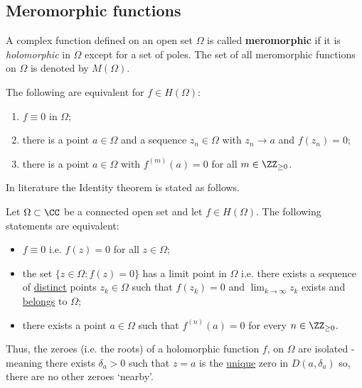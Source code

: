 \documentclass[12pt, a4paper]{article}
\begin{document}
\subsection{Meromorphic functions}

\begin{definition}
    A complex function defined on an open set \(\Omega\) is called \textbf{meromorphic} if it is \textit{holomorphic} in \(\Omega\) except for a set of poles. The set of all meromorphic functions on \(\Omega\) is denoted by \(M(\Omega)\).
\end{definition}

\begin{mdprop}
    The following are equivalent for \(f \in H(\Omega)\):
    \begin{enumerate}
        \item \(f \equiv 0\) in \(\Omega\);
        \item there is a point \(a \in \Omega\) and a sequence \(z_n \in \Omega\) with \(z_n\to a\) and \(f(z_n)=0\);
        \item there is a point \(a \in \Omega\) with \(f^{(m)}(a) =0\) for all \(m \in \ZZ_{\geq 0}\).
    \end{enumerate}
\end{mdprop}

\begin{mdremark}
    In literature the Identity theorem is stated as follows.
    \begin{theorem}
        Let \(\Omega \subset \CC\) be a connected open set and let \(f \in H(\Omega)\). The following statements are equivalent:
        \begin{itemize}
            \item \(f \equiv 0\) i.e. \(f(z)=0\) for all \(z \in \Omega\);
            \item the set \(\{z \in \Omega : f(z)=0\}\) has a limit point in \(\Omega\) i.e. there exists a sequence of \underline{distinct} points \(z_k \in \Omega\) such that \(f(z_k)=0\) and \(\lim_{k \to \infty} z_k\) exists and \underline{belongs} to \(\Omega\);
            \item there exists a point \(a \in \Omega\) such that \(f^{(n)}(a)=0\) for every \(n \in \ZZ_{\geq 0}\).
        \end{itemize}
    \end{theorem}
\end{mdremark}

\begin{mdnote}
    Thus, the zeroes (i.e. the roots) of a holomorphic function \(f\), on \(\Omega\) are isolated - meaning there exists \(\delta_a >0\) such that \(z=a\) is the \underline{unique} zero in \(D(a,\delta_a)\) so, there are no other zeroes `nearby'.
\end{mdnote}
\end{document}
